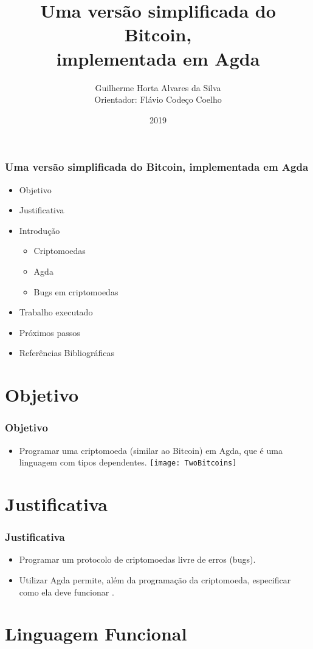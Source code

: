 \documentclass{beamer}
\title{Uma versão simplificada do Bitcoin, \\
  implementada em Agda}
\author[Guilherme, Flávio]{Guilherme Horta Alvares da Silva \\
  Orientador: Flávio Codeço Coelho}
\institute{Fundação Getulio Vargas}
\date{2019}
\begin{document}
 
\frame{\titlepage}

\begin{frame}
  \frametitle{Uma versão simplificada do Bitcoin, implementada em Agda}
\begin{itemize}
  \item Objetivo
  \item Justificativa
  \item Introdução
  \begin{itemize}
    \item Criptomoedas
    \item Agda
    \item Bugs em criptomoedas
  \end{itemize}
  \item Trabalho executado
  \item Próximos passos
  \item Referências Bibliográficas
\end{itemize}
\end{frame}

\section{Objetivo}

 \begin{frame}
\frametitle{Objetivo}
\begin{itemize}
  \item Programar uma criptomoeda (similar ao Bitcoin) em Agda, que é uma linguagem com tipos dependentes.
    \texttt{[image: TwoBitcoins]}
\end{itemize}
\end{frame}
 
\section{Justificativa}

\begin{frame}
\frametitle{Justificativa}
\begin{itemize}
    \item Programar um protocolo de criptomoedas livre de erros (bugs).
    \item Utilizar Agda permite, além da programação da criptomoeda, especificar como ela deve funcionar
      \cite{norell2008dependently}.
\end{itemize}
\end{frame}

\section{Linguagem Funcional}
\end{document}
